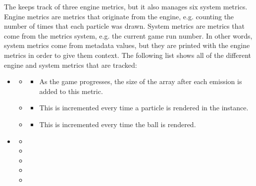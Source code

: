 The  keeps track of three engine metrics, but it also manages six system metrics. Engine metrics are metrics that originate from the engine, e.g. counting the number of times that each particle was drawn. System metrics are metrics that come from the metrics system, e.g. the current game run number. In other words, system metrics come from metadata values, but they are printed with the engine metrics in order to give them context. The following list shows all of the different engine and system metrics that are tracked:

\begin{singlespace}

	\begin{itemize}[nolistsep,topsep=0pt]
	\itemsep1.0em

		\item {}
		\begin{itemize}[nolistsep,topsep=0pt]
			\item {}
				\begin{itemize}[nolistsep,topsep=0pt]
					\item As the game progresses, the size of the  array after each emission is added to this metric.
				\end{itemize}
			\item {}
				\begin{itemize}[nolistsep,topsep=0pt]
					\item This is incremented every time a particle is rendered in the  instance.
				\end{itemize}
			\item {}
				\begin{itemize}[nolistsep,topsep=0pt]
					\item This is incremented every time the ball is rendered.
				\end{itemize}
		\end{itemize}

		\item {}
		\begin{itemize}[nolistsep,topsep=0pt]
			\item {}
			\item {}
			\item {}
			\item {}
			\item {}
		\end{itemize}

	\end{itemize}

\end{singlespace}

